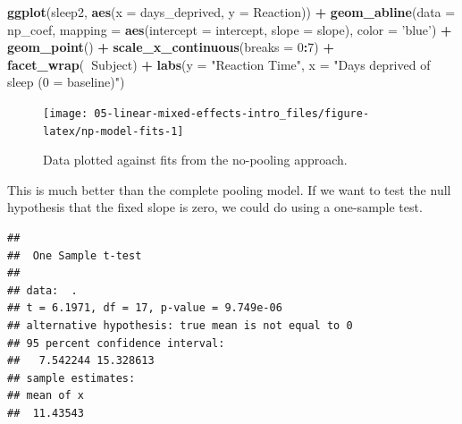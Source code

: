 \documentclass[]{book}
\newenvironment{Shaded}{\begin{snugshade}}{\end{snugshade}}
\newcommand{\DataTypeTok}[1]{\textcolor[rgb]{0.13,0.29,0.53}{#1}}
\newcommand{\DecValTok}[1]{\textcolor[rgb]{0.00,0.00,0.81}{#1}}
\newcommand{\KeywordTok}[1]{\textcolor[rgb]{0.13,0.29,0.53}{\textbf{#1}}}
\newcommand{\NormalTok}[1]{#1}
\newcommand{\OperatorTok}[1]{\textcolor[rgb]{0.81,0.36,0.00}{\textbf{#1}}}
\newcommand{\StringTok}[1]{\textcolor[rgb]{0.31,0.60,0.02}{#1}}
\begin{document}
\begin{Shaded}
\begin{Highlighting}[]
\KeywordTok{ggplot}\NormalTok{(sleep2, }\KeywordTok{aes}\NormalTok{(}\DataTypeTok{x =}\NormalTok{ days_deprived, }\DataTypeTok{y =}\NormalTok{ Reaction)) }\OperatorTok{+}
\StringTok{  }\KeywordTok{geom_abline}\NormalTok{(}\DataTypeTok{data =}\NormalTok{ np_coef,}
              \DataTypeTok{mapping =} \KeywordTok{aes}\NormalTok{(}\DataTypeTok{intercept =}\NormalTok{ intercept,}
                            \DataTypeTok{slope =}\NormalTok{ slope),}
              \DataTypeTok{color =} \StringTok{'blue'}\NormalTok{) }\OperatorTok{+}
\StringTok{  }\KeywordTok{geom_point}\NormalTok{() }\OperatorTok{+}
\StringTok{  }\KeywordTok{scale_x_continuous}\NormalTok{(}\DataTypeTok{breaks =} \DecValTok{0}\OperatorTok{:}\DecValTok{7}\NormalTok{) }\OperatorTok{+}
\StringTok{  }\KeywordTok{facet_wrap}\NormalTok{(}\OperatorTok{~}\NormalTok{Subject) }\OperatorTok{+}
\StringTok{  }\KeywordTok{labs}\NormalTok{(}\DataTypeTok{y =} \StringTok{"Reaction Time"}\NormalTok{, }\DataTypeTok{x =} \StringTok{"Days deprived of sleep (0 = baseline)"}\NormalTok{)}
\end{Highlighting}
\end{Shaded}

\begin{figure}

{\centering \texttt{[image: 05-linear-mixed-effects-intro\_files/figure-latex/np-model-fits-1]} 

}

\caption{Data plotted against fits from the no-pooling approach.}\label{fig:np-model-fits}
\end{figure}

This is much better than the complete pooling model. If we want to test the null hypothesis that the fixed slope is zero, we could do using a one-sample test.

\begin{Shaded}
\end{Shaded}

\begin{verbatim}
## 
## 	One Sample t-test
## 
## data:  .
## t = 6.1971, df = 17, p-value = 9.749e-06
## alternative hypothesis: true mean is not equal to 0
## 95 percent confidence interval:
##   7.542244 15.328613
## sample estimates:
## mean of x 
##  11.43543
\end{verbatim}
\end{document}
